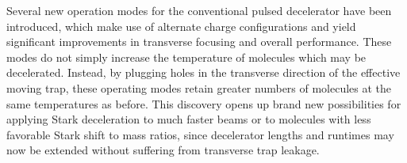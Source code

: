 \documentclass[%
 reprint,
 amsmath,amssymb,
 aps,
prl,
]{revtex4-1}
\begin{document}



Several new operation modes for the conventional pulsed decelerator have been introduced, which make use of alternate charge configurations and yield significant improvements in transverse focusing and overall performance.
These modes do not simply increase the temperature of molecules which may be decelerated.
Instead, by plugging holes in the transverse direction of the effective moving trap, these operating modes retain greater numbers of molecules at the same temperatures as before.
This discovery opens up brand new possibilities for applying Stark deceleration to much faster beams or to molecules with less favorable Stark shift to mass ratios, since decelerator lengths and runtimes may now be extended without suffering from transverse trap leakage.
\end{document}
